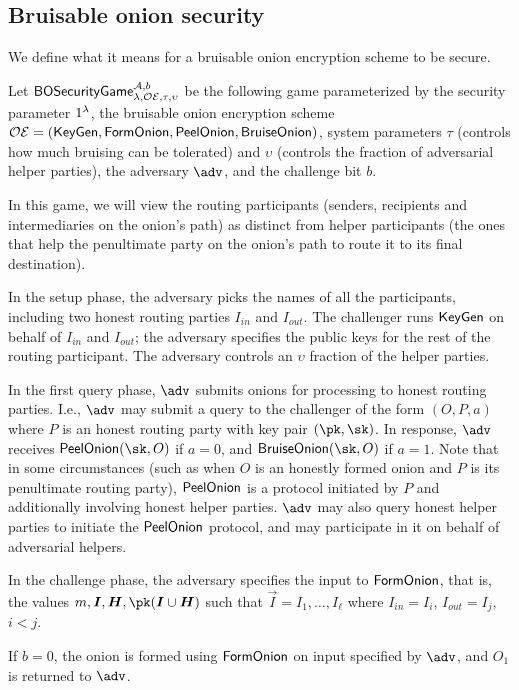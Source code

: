 \iffalse 
\subsection{Bruisable onion security}
We define what it means for a bruisable onion encryption scheme to be secure. 

Let $\mathsf{BOSecurityGame}_{\lambda, \mathcal{OE}, \tau, \upsilon}^{\mathcal{A},b}$ be the following game parameterized by 
the security parameter $1^\lambda$, 
the bruisable onion encryption scheme $\mathcal{OE} = (\mathsf{KeyGen}, \mathsf{FormOnion}, \mathsf{PeelOnion}, \mathsf{BruiseOnion})$, 
system parameters $\tau$ (controls how much bruising can be tolerated) and $\upsilon$ (controls the fraction of adversarial helper parties), 
the adversary $\adv$, and 
the challenge bit $b$. 

In this game, we will view the routing participants (senders, recipients and intermediaries on the onion's path) as distinct from helper participants (the ones that help the penultimate party on the onion's path to route it to its final destination).  

In the setup phase, the adversary picks the names of all the participants, including two honest routing parties $I_{\mathit{in}}$ and $I_{\mathit{out}}$.  The challenger runs $\mathsf{KeyGen}$ on behalf of $I_{\mathit{in}}$ and $I_{\mathit{out}}$; the adversary specifies the public keys for the rest of the routing participant.  The adversary controls an $\upsilon$ fraction of the helper parties.

In the first query phase, $\adv$ submits onions for processing to honest routing parties.  I.e., $\adv$ may submit a query to the challenger of the form $(O,P,a)$ where $P$ is an honest routing party with key pair $(\pk,\sk)$.  In response, $\adv$ receives $\proconion(\sk,O)$ if $a=0$, and $\bruiseonion(\sk,O)$ if $a=1$.  Note that in some circumstances (such as when $O$ is an honestly formed onion and $P$ is its penultimate routing party), $\mathsf{PeelOnion}$ is a protocol initiated by $P$ and additionally involving honest helper parties.  $\adv$ may also query honest helper parties to initiate the $\mathsf{PeelOnion}$ protocol, and may participate in it on behalf of adversarial helpers.

In the challenge phase, the adversary specifies the input to $\mathsf{FormOnion}$, that is, the values $m, \vec{I}, \vec{H}, \pk(\vec{I}\cup\vec{H})$ such that $\vec{I} = I_1,\ldots,I_\ell$ where $I_{\mathit{in}}=I_i$, $I_{\mathit{out}}=I_j$, $i < j$.  

If $b=0$, the onion is formed using $\mathsf{FormOnion}$ on input specified by $\adv$, and $O_1$ is returned to $\adv$.

